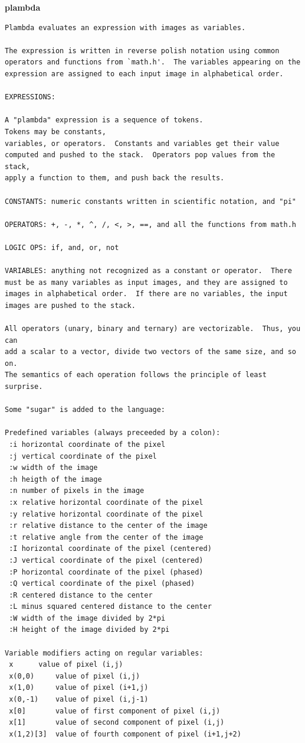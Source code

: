 {\bf plambda}
 \begin{verbatim}
Plambda evaluates an expression with images as variables.

The expression is written in reverse polish notation using common
operators and functions from `math.h'.  The variables appearing on the
expression are assigned to each input image in alphabetical order.

EXPRESSIONS:

A "plambda" expression is a sequence of tokens.
Tokens may be constants,
variables, or operators.  Constants and variables get their value
computed and pushed to the stack.  Operators pop values from the stack,
apply a function to them, and push back the results.

CONSTANTS: numeric constants written in scientific notation, and "pi"

OPERATORS: +, -, *, ^, /, <, >, ==, and all the functions from math.h

LOGIC OPS: if, and, or, not

VARIABLES: anything not recognized as a constant or operator.  There
must be as many variables as input images, and they are assigned to
images in alphabetical order.  If there are no variables, the input
images are pushed to the stack.

All operators (unary, binary and ternary) are vectorizable.  Thus, you can
add a scalar to a vector, divide two vectors of the same size, and so on.
The semantics of each operation follows the principle of least surprise.

Some "sugar" is added to the language:

Predefined variables (always preceeded by a colon):
 :i	horizontal coordinate of the pixel
 :j	vertical coordinate of the pixel
 :w	width of the image
 :h	heigth of the image
 :n	number of pixels in the image
 :x	relative horizontal coordinate of the pixel
 :y	relative horizontal coordinate of the pixel
 :r	relative distance to the center of the image
 :t	relative angle from the center of the image
 :I	horizontal coordinate of the pixel (centered)
 :J	vertical coordinate of the pixel (centered)
 :P	horizontal coordinate of the pixel (phased)
 :Q	vertical coordinate of the pixel (phased)
 :R	centered distance to the center
 :L	minus squared centered distance to the center
 :W	width of the image divided by 2*pi
 :H	height of the image divided by 2*pi

Variable modifiers acting on regular variables:
 x		value of pixel (i,j)
 x(0,0)		value of pixel (i,j)
 x(1,0)		value of pixel (i+1,j)
 x(0,-1)	value of pixel (i,j-1)
 x[0]		value of first component of pixel (i,j)
 x[1]		value of second component of pixel (i,j)
 x(1,2)[3]	value of fourth component of pixel (i+1,j+2)


\end{verbatim}
